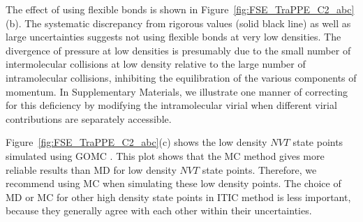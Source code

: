 \documentclass[5p,times]{elsarticle}
\begin{document}
The effect of using flexible bonds is shown in Figure~\ref{fig:FSE_TraPPE_C2_abc}(b). The systematic discrepancy from rigorous values (solid black line) as well as large uncertainties suggests not using flexible bonds at very low densities. The divergence of pressure at low densities is presumably due to the small number of intermolecular collisions at low density relative to the large number of intramolecular collisions, inhibiting the equilibration of the various components of momentum. In Supplementary Materials, we illustrate one manner of correcting for this deficiency by modifying the intramolecular virial when different virial contributions are separately accessible.

Figure~\ref{fig:FSE_TraPPE_C2_abc}(c) shows the low density $NVT$ state points simulated using GOMC \cite{Mick2013}. This plot shows that the MC method gives more reliable results than MD for low density $NVT$ state points. 
Therefore, we recommend using MC when simulating these low density points. The choice of MD or MC for other high density state points in ITIC method is less important, because they generally agree with each other within their uncertainties. %
\end{document}
